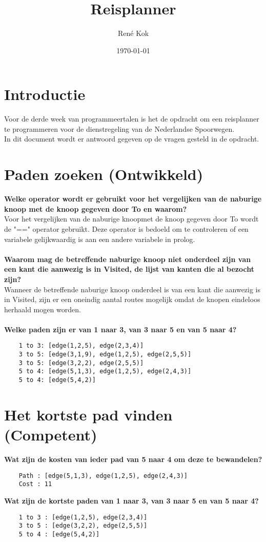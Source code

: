 \documentclass{uva-inf-article}
\title{Reisplanner}
\author{René Kok}
\date{\today}
\begin{document}
\maketitle

\section{Introductie}
Voor de derde week van programmeertalen is het de opdracht om een reisplanner te programmeren 
voor de dienstregeling van de Nederlandse Spoorwegen.\\
In dit document wordt er antwoord gegeven op de vragen gesteld in de opdracht.

\section{Paden zoeken (Ontwikkeld)}
\textbf{Welke operator wordt er gebruikt voor het vergelijken van de naburige knoop met de knoop gegeven door To en waarom?}\\
Voor het vergelijken van de naburige knoopmet de knoop gegeven door To wordt de "==" operator gebruikt. 
Deze operator is bedoeld om te controleren of een variabele gelijkwaardig is aan een andere variabele in prolog.\\\\  
\textbf{Waarom mag de betreffende naburige knoop niet onderdeel zijn van een kant die aanwezig is in Visited, de lijst van kanten die al bezocht zijn?}\\
Wanneer de betreffende naburige knoop onderdeel is van een kant die aanwezig is in Visited, 
zijn er een oneindig aantal routes mogelijk omdat de knopen eindeloos herhaald mogen worden.\\\\
\textbf{Welke paden zijn er van 1 naar 3, van 3 naar 5 en van 5 naar 4?}

\begin{lstlisting}
    1 to 3: [edge(1,2,5), edge(2,3,4)]
    3 to 5: [edge(3,1,9), edge(1,2,5), edge(2,5,5)]
    3 to 5: [edge(3,2,2), edge(2,5,5)]
    5 to 4: [edge(5,1,3), edge(1,2,5), edge(2,4,3)]
    5 to 4: [edge(5,4,2)]
\end{lstlisting}

\newpage
\section{Het kortste pad vinden (Competent)}
\textbf{Wat zijn de kosten van ieder pad van 5 naar 4 om deze te bewandelen?}
\begin{lstlisting}
    Path : [edge(5,1,3), edge(1,2,5), edge(2,4,3)]
    Cost : 11
\end{lstlisting}
\textbf{Wat zijn de kortste paden van 1 naar 3, van 3 naar 5 en van 5 naar 4?}
\begin{lstlisting}
    1 to 3 : [edge(1,2,5), edge(2,3,4)]
    3 to 5 : [edge(3,2,2), edge(2,5,5)]
    5 to 4 : [edge(5,4,2)]
\end{lstlisting}
\end{document}
